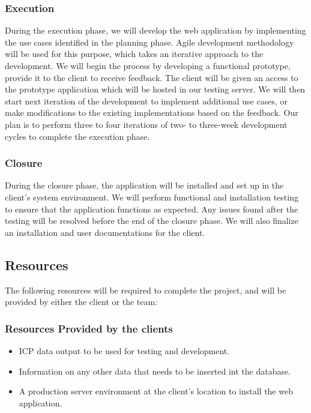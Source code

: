 \documentclass[10pt,twocolumn,letterpaper]{article}
\begin{document}
                \subsubsection{Execution}
                During the execution phase, we will develop the web application by implementing the use cases identified in the planning phase. Agile development methodology will be used for this purpose, which takes an iterative approach to the development. We will begin the process by developing a functional prototype, provide it to the client to receive feedback. The client will be given an access to the prototype application which will be hosted in our testing server. We will then start next iteration of the development to implement additional use cases, or make modifications to the existing implementations based on the feedback. Our plan is to perform three to four iterations of two- to three-week development cycles to complete the execution phase.
                \subsubsection{Closure}
                During the closure phase, the application will be installed and set up in the client's system environment. We will perform functional and installation testing to ensure that the application functions as expected. Any issues found after the testing will be resolved before the end of the closure phase. We will also finalize an installation and user documentations for the client.
            \subsection{Resources}

            The following resources will be required to complete the project, and will be provided by either the client or the team:
                \subsubsection{Resources Provided by the clients}
                \begin{itemize}
                  \item ICP data output to be used for testing and development.
                  \item Information on any other data that needs to be inserted int the database.
                  \item A production server environment at the client's location to install the web application.
                \end{itemize}
\end{document}
